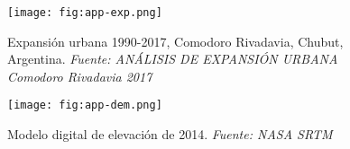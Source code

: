 \begin{frame}{}
  \begin{figure}
    \centering
    \texttt{[image: fig:app-exp.png]}
    \caption{Expansión urbana 1990-2017, Comodoro Rivadavia, Chubut, Argentina. \emph{Fuente: ANÁLISIS DE
EXPANSIÓN URBANA Comodoro Rivadavia 2017}}
    \label{}
  \end{figure}
\end{frame}

\begin{frame}{}
  \begin{figure}
    \centering
    \texttt{[image: fig:app-dem.png]}
    \caption{Modelo digital de elevación de 2014. \emph{Fuente: NASA SRTM}}
    \label{}
  \end{figure}
\end{frame}



\gracias

